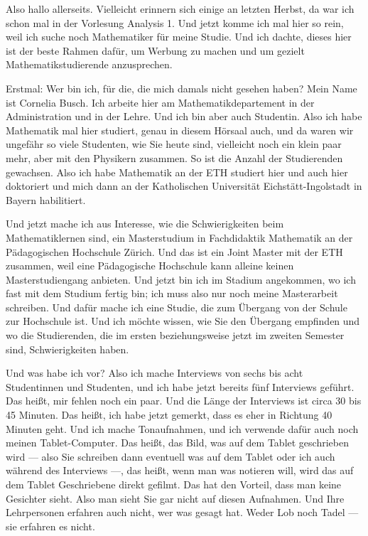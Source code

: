 \begin{spoken-clean}[00:41:30 - 00:46:53]

Also hallo allerseits. Vielleicht erinnern sich einige an letzten Herbst, da war ich schon mal in der Vorlesung Analysis 1. Und jetzt komme ich mal hier so rein, weil ich suche noch Mathematiker für meine Studie. Und ich dachte, dieses hier ist der beste Rahmen dafür, um Werbung zu machen und um gezielt Mathematikstudierende anzusprechen.

Erstmal: Wer bin ich, für die, die mich damals nicht gesehen haben? Mein Name ist Cornelia Busch. Ich arbeite hier am Mathematikdepartement in der Administration und in der Lehre. Und ich bin aber auch Studentin. Also ich habe Mathematik mal hier studiert, genau in diesem Hörsaal auch, und da waren wir ungefähr so viele Studenten, wie Sie heute sind, vielleicht noch ein klein paar mehr, aber mit den Physikern zusammen. So ist die Anzahl der Studierenden gewachsen. Also ich habe Mathematik an der ETH studiert hier und auch hier doktoriert und mich dann an der Katholischen Universität Eichstätt-Ingolstadt in Bayern habilitiert.

Und jetzt mache ich aus Interesse, wie die Schwierigkeiten beim Mathematiklernen sind, ein Masterstudium in Fachdidaktik Mathematik an der Pädagogischen Hochschule Zürich. Und das ist ein Joint Master mit der ETH zusammen, weil eine Pädagogische Hochschule kann alleine keinen Masterstudiengang anbieten. Und jetzt bin ich im Stadium angekommen, wo ich fast mit dem Studium fertig bin; ich muss also nur noch meine Masterarbeit schreiben. Und dafür mache ich eine Studie, die zum Übergang von der Schule zur Hochschule ist. Und ich möchte wissen, wie Sie den Übergang empfinden und wo die Studierenden, die im ersten beziehungsweise jetzt im zweiten Semester sind, Schwierigkeiten haben.

Und was habe ich vor? Also ich mache Interviews von sechs bis acht Studentinnen und Studenten, und ich habe jetzt bereits fünf Interviews geführt. Das heißt, mir fehlen noch ein paar. Und die Länge der Interviews ist circa 30 bis 45 Minuten. Das heißt, ich habe jetzt gemerkt, dass es eher in Richtung 40 Minuten geht. Und ich mache Tonaufnahmen, und ich verwende dafür auch noch meinen Tablet-Computer. Das heißt, das Bild, was auf dem Tablet geschrieben wird --- also Sie schreiben dann eventuell was auf dem Tablet oder ich auch während des Interviews ---, das heißt, wenn man was notieren will, wird das auf dem Tablet Geschriebene direkt gefilmt. Das hat den Vorteil, dass man keine Gesichter sieht. Also man sieht Sie gar nicht auf diesen Aufnahmen. Und Ihre Lehrpersonen erfahren auch nicht, wer was gesagt hat. Weder Lob noch Tadel --- sie erfahren es nicht.


\end{spoken-clean}
